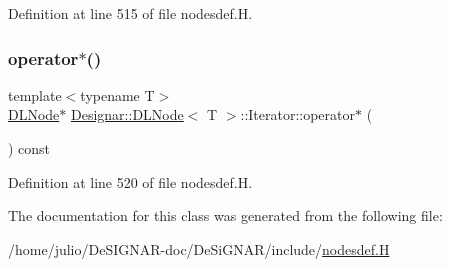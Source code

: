 Definition at line 515 of file nodesdef.\+H.

\mbox{\label{class_designar_1_1_d_l_node_1_1_iterator_ae75896ae631f91daaaa9a193df27a239}} 
\subsubsection{\texorpdfstring{operator$\ast$()}{operator*()}\hspace{0.1cm}{\footnotesize\ttfamily [2/2]}}
{\footnotesize\ttfamily template$<$typename T$>$ \\
\hyperlink{class_designar_1_1_d_l_node}{D\+L\+Node}$\ast$ \hyperlink{class_designar_1_1_d_l_node}{Designar\+::\+D\+L\+Node}$<$ T $>$\+::Iterator\+::operator$\ast$ (\begin{DoxyParamCaption}{ }\end{DoxyParamCaption}) const\hspace{0.3cm}{\ttfamily [inline]}}



Definition at line 520 of file nodesdef.\+H.



The documentation for this class was generated from the following file\+:\begin{DoxyCompactItemize}
\item 
/home/julio/\+De\+S\+I\+G\+N\+A\+R-\/doc/\+De\+Si\+G\+N\+A\+R/include/\hyperlink{nodesdef_8_h}{nodesdef.\+H}\end{DoxyCompactItemize}
